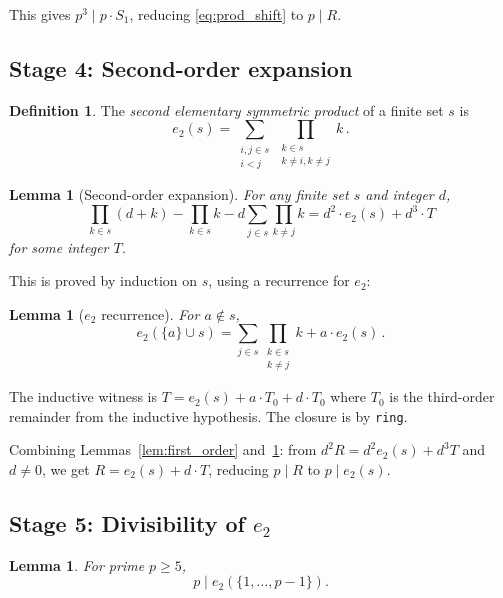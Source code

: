\documentclass[11pt]{article}
\newtheorem{lemma}[theorem]{Lemma}
\theoremstyle{definition}
\newtheorem{definition}[theorem]{Definition}
\theoremstyle{remark}
\begin{document}
This gives $p^3 \mid p \cdot S_1$, reducing \eqref{eq:prod_shift} to $p \mid R$.

\subsection{Stage 4: Second-order expansion}

\begin{definition}
The \emph{second elementary symmetric product} of a finite set $s$ is
\[
e_2(s) = \sum_{\substack{i, j \in s \\ i < j}} \prod_{\substack{k \in s \\ k \neq i, k \neq j}} k\,.
\]
\end{definition}

\begin{lemma}[Second-order expansion]\label{lem:second_order}
For any finite set $s$ and integer $d$,
\[
\prod_{k \in s}(d+k) - \prod_{k \in s} k - d \sum_{j \in s} \prod_{k \neq j} k = d^2 \cdot e_2(s) + d^3 \cdot T
\]
for some integer $T$.
\end{lemma}

This is proved by induction on $s$, using a recurrence for $e_2$:

\begin{lemma}[$e_2$ recurrence]\label{lem:e2_cons}
For $a \notin s$,
\[
e_2(\{a\} \cup s) = \sum_{j \in s} \prod_{\substack{k \in s \\ k \neq j}} k + a \cdot e_2(s)\,.
\]
\end{lemma}

The inductive witness is $T = e_2(s) + a \cdot T_0 + d \cdot T_0$ where $T_0$ is the third-order remainder from the inductive hypothesis. The closure is by \texttt{ring}.

Combining Lemmas~\ref{lem:first_order} and~\ref{lem:second_order}: from $d^2 R = d^2 e_2(s) + d^3 T$ and $d \neq 0$, we get $R = e_2(s) + d \cdot T$, reducing $p \mid R$ to $p \mid e_2(s)$.

\subsection{Stage 5: Divisibility of $e_2$}

\begin{lemma}\label{lem:p_dvd_e2}
For prime $p \geq 5$,
\[
p \;\Big|\; e_2(\{1, \ldots, p-1\}).
\]
\end{lemma}
\end{document}
